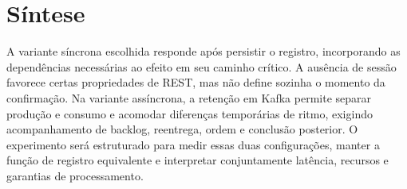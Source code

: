 \section{Síntese}

A variante síncrona escolhida responde após persistir o registro, incorporando as dependências necessárias ao efeito em seu caminho crítico. A ausência de sessão favorece certas propriedades de REST, mas não define sozinha o momento da confirmação. Na variante assíncrona, a retenção em Kafka permite separar produção e consumo e acomodar diferenças temporárias de ritmo, exigindo acompanhamento de backlog, reentrega, ordem e conclusão posterior. O experimento será estruturado para medir essas duas configurações, manter a função de registro equivalente e interpretar conjuntamente latência, recursos e garantias de processamento.

